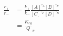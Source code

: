 \begin{eqnarray}
\frac{r_+}{r_-} & = \frac{k_+}{k_-}\frac{[A]^{\gamma_A}[B]^{\gamma_B}}{[C]^{\gamma_C}[D]^{\gamma_D}} \\
&  =  \frac{K_{eq}}Q_r \\
\end{eqnarray}